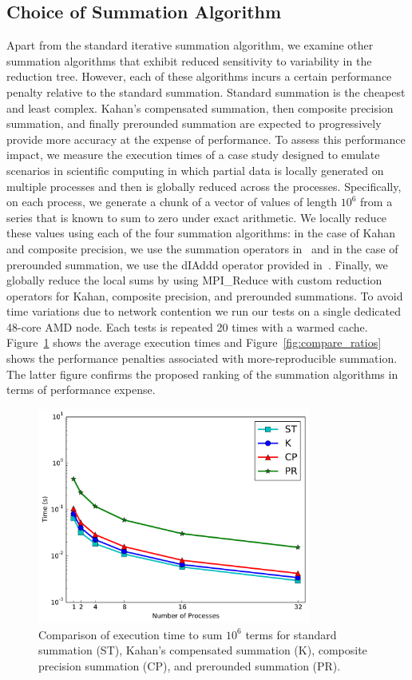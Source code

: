 \subsection{Choice of Summation Algorithm}

Apart from the standard iterative summation algorithm, we examine
other summation algorithms that exhibit reduced sensitivity to
variability in the reduction tree. However, each of these algorithms
incurs a certain performance penalty relative to the standard
summation. Standard summation is the cheapest and least
complex. Kahan's compensated summation, then composite precision
summation, and finally prerounded summation are expected to
progressively provide more accuracy at the expense of performance. To
assess this performance impact, we measure the execution times of a
case study designed to emulate scenarios in scientific computing in
which partial data is locally generated on multiple processes and then
is globally reduced across the processes. Specifically, on each
process, we generate a chunk of a vector of values of length $10^6$
from a series that is known to sum to zero under exact arithmetic. We
locally reduce these values using each of the four summation
algorithms: in the case of Kahan and composite precision, we use the
summation operators in~\cite{Robey2011} and in the case of prerounded
summation, we use the dIAddd operator provided
in~\cite{reproblas}. Finally, we globally reduce the local sums by
using MPI\_Reduce with custom reduction operators for Kahan, composite
precision, and prerounded summations. To avoid time variations due to
network contention we run our tests on a single dedicated 48-core AMD
node. Each tests is repeated 20 times with a warmed
cache. Figure~\ref{fig:compare_runtimes} shows the average execution
times and Figure~\ref{fig:compare_ratios} shows the performance
penalties associated with more-reproducible summation. The latter
figure confirms the proposed ranking of the summation algorithms in
terms of performance expense.
\begin{figure}[!htb]
    \centering
    \includegraphics[width=0.80\textwidth]{chapter_2_figures/runtimes.pdf}
    \caption{Comparison of execution time to sum $10^6$ terms for
      standard summation (ST), Kahan's compensated summation (K),
      composite precision summation (CP), and prerounded summation
      (PR).}
    \label{fig:compare_runtimes}
\end{figure}
